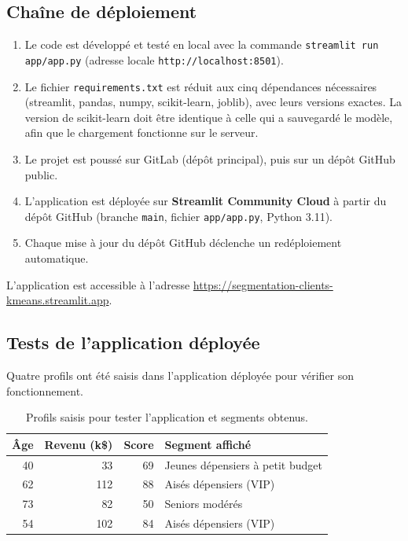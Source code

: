 \documentclass[11pt,a4paper]{article}
\begin{document}
\subsection{Chaîne de déploiement}
\begin{enumerate}
  \item Le code est développé et testé en local avec la commande \texttt{streamlit run app/app.py} (adresse locale \texttt{http://localhost:8501}).
  \item Le fichier \texttt{requirements.txt} est réduit aux cinq dépendances nécessaires (streamlit, pandas, numpy, scikit-learn, joblib), avec leurs versions exactes. La version de scikit-learn doit être identique à celle qui a sauvegardé le modèle, afin que le chargement fonctionne sur le serveur.
  \item Le projet est poussé sur GitLab (dépôt principal), puis sur un dépôt GitHub public.
  \item L'application est déployée sur \textbf{Streamlit Community Cloud} à partir du dépôt GitHub (branche \texttt{main}, fichier \texttt{app/app.py}, Python 3.11).
  \item Chaque mise à jour du dépôt GitHub déclenche un redéploiement automatique.
\end{enumerate}

L'application est accessible à l'adresse \url{https://segmentation-clients-kmeans.streamlit.app}.

\subsection{Tests de l'application déployée}
Quatre profils ont été saisis dans l'application déployée pour vérifier son fonctionnement.

\begin{table}[H]
\centering
\begin{tabular}{@{}rrrl@{}}
\toprule
\textbf{Âge} & \textbf{Revenu (k\$)} & \textbf{Score} & \textbf{Segment affiché}\\
\midrule
40 & 33 & 69 & Jeunes dépensiers à petit budget\\
62 & 112 & 88 & Aisés dépensiers (VIP)\\
73 & 82 & 50 & Seniors modérés\\
54 & 102 & 84 & Aisés dépensiers (VIP)\\
\bottomrule
\end{tabular}
\caption{Profils saisis pour tester l'application et segments obtenus.}
\label{tab:tests}
\end{table}
\end{document}
